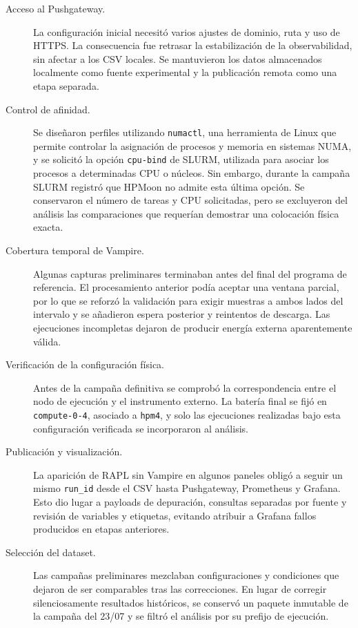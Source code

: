 \begin{description}
    \item[Acceso al Pushgateway.] La configuración inicial necesitó varios ajustes de dominio, ruta y uso de HTTPS. La consecuencia fue retrasar la estabilización de la observabilidad, sin afectar a los CSV locales. Se mantuvieron los datos almacenados localmente como fuente experimental y la publicación remota como una etapa separada.

    \item[Control de afinidad.] Se diseñaron perfiles utilizando \texttt{numactl}, una herramienta de Linux que permite controlar la asignación de procesos y memoria en sistemas NUMA, y se solicitó la opción \texttt{cpu-bind} de SLURM, utilizada para asociar los procesos a determinadas CPU o núcleos. Sin embargo, durante la campaña SLURM registró que HPMoon no admite esta última opción. Se conservaron el número de tareas y CPU solicitadas, pero se excluyeron del análisis las comparaciones que requerían demostrar una colocación física exacta.

    \item[Cobertura temporal de Vampire.] Algunas capturas preliminares terminaban antes del final del programa de referencia. El procesamiento anterior podía aceptar una ventana parcial, por lo que se reforzó la validación para exigir muestras a ambos lados del intervalo y se añadieron espera posterior y reintentos de descarga. Las ejecuciones incompletas dejaron de producir energía externa aparentemente válida.

    \item[Verificación de la configuración física.] Antes de la campaña definitiva se comprobó la correspondencia entre el nodo de ejecución y el instrumento externo. La batería final se fijó en \texttt{compute-0-4}, asociado a \texttt{hpm4}, y solo las ejecuciones realizadas bajo esta configuración verificada se incorporaron al análisis.

    \item[Publicación y visualización.] La aparición de RAPL sin Vampire en algunos paneles obligó a seguir un mismo \texttt{run\_id} desde el CSV hasta Pushgateway, Prometheus y Grafana. Esto dio lugar a payloads de depuración, consultas separadas por fuente y revisión de variables y etiquetas, evitando atribuir a Grafana fallos producidos en etapas anteriores.

    \item[Selección del dataset.] Las campañas preliminares mezclaban configuraciones y condiciones que dejaron de ser comparables tras las correcciones. En lugar de corregir silenciosamente resultados históricos, se conservó un paquete inmutable de la campaña del 23/07 y se filtró el análisis por su prefijo de ejecución.
\end{description}


